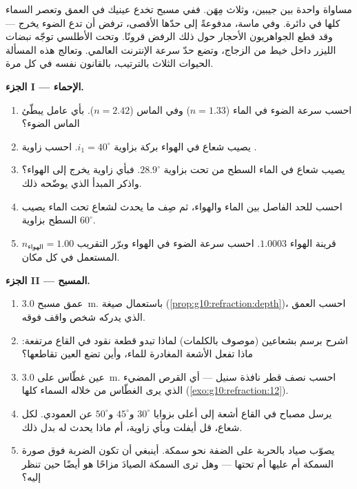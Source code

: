 \begin{problem}
\label{pb:g10:refraction:1}
مساواة واحدة بين جيبين، وثلاث مِهَن. ففي مسبح تخدع
عينيك في العمق وتعصر السماء كلها في دائرة. وفي
ماسة، مدفوعةً إلى حدّها الأقصى، ترفض أن تدع الضوء يخرج ---
وقد قطع الجواهريون الأحجار حول ذلك الرفض قرونًا. وتحت
الأطلسي توجّه نبضات الليزر داخل خيط من الزجاج، وتضع
حدّ سرعة الإنترنت العالمي. وتعالج هذه المسألة
الحيوات الثلاث بالترتيب، بالقانون نفسه في كل مرة.

\medskip
\noindent\textbf{الجزء I --- الإحماء.}
\begin{enumerate}
  \item احسب سرعة الضوء في الماء ($n = 1.33$) وفي الماس
        ($n = 2.42$). بأي عامل يبطّئ الماس الضوء؟
  \item يصيب شعاع في الهواء بركة بزاوية $i_1 = 40^\circ$. احسب
        زاوية .
  \item يصيب شعاع في الماء السطح من تحت بزاوية $28.9^\circ$.
        فبأي زاوية يخرج إلى الهواء؟ واذكر المبدأ
        الذي يوضّحه ذلك.
  \item احسب  للحد الفاصل بين الماء والهواء، ثم
        صِف ما يحدث لشعاع تحت الماء يصيب السطح
        بزاوية $60^\circ$.
  \item قرينة الهواء $1.0003$. احسب سرعة الضوء في الهواء
        وبرّر التقريب $n_{\text{الهواء}} = 1.00$ المستعمل
        في كل مكان.
\end{enumerate}

\medskip
\noindent\textbf{الجزء II --- المسبح.}
\begin{enumerate}[resume]
  \item عمق مسبح \qty{3.0}{m}. باستعمال صيغة 
        (\cref{prop:g10:refraction:depth})، احسب العمق الذي يدركه شخص
        واقف فوقه.
  \item اشرح برسم بشعاعين (موصوف بالكلمات) لماذا تبدو قطعة نقود
        في القاع مرتفعة: ماذا تفعل الأشعة المغادرة للماء،
        وأين تضع العين تقاطعها؟
  \item عين غطّاس على \qty{3.0}{m}. احسب نصف قطر نافذة
        سنيل --- أي القرص المضيء الذي يرى الغطّاس من خلاله
        السماء كلها (\cref{exo:g10:refraction:12}).
  \item يرسل مصباح في القاع أشعة إلى أعلى بزوايا $30^\circ$
        و$45^\circ$ و$50^\circ$ عن العمودي. لكل شعاع، قل
        أيفلت وبأي زاوية، أم ماذا يحدث له بدل ذلك.
  \item يصوّب صياد بالحربة على الضفة نحو سمكة. أينبغي أن تكون الضربة
        فوق صورة السمكة أم عليها أم تحتها --- وهل ترى
        السمكة الصيادَ مزاحًا هو أيضًا حين تنظر إليه؟
\end{enumerate}


\end{problem}

